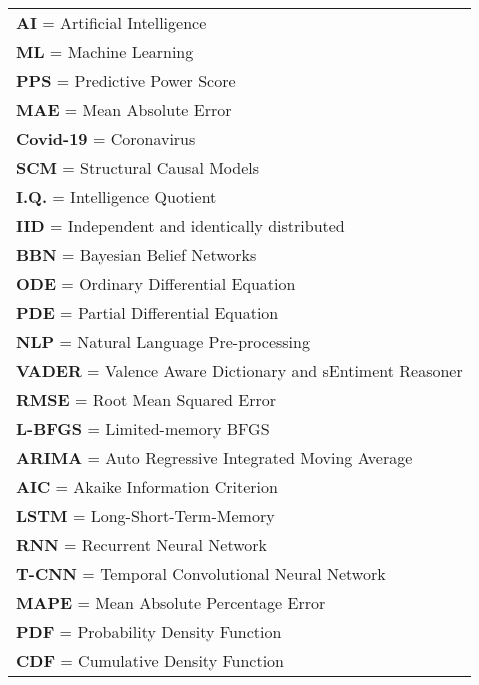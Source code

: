 \newpage
{}

\begin{Listofabbreviations}
\vspace*{10pt}

\begin{center}
    \begin{tabular}{@{}l@{}}
    \textbf{AI} = Artificial Intelligence \\
    \textbf{ML} = Machine Learning \\
    \textbf{PPS} = Predictive Power Score \\
    \textbf{MAE} = Mean Absolute Error \\
    \textbf{Covid-19} = Coronavirus \\
    \textbf{SCM} = Structural Causal Models \\
    \textbf{I.Q.} = Intelligence Quotient \\
    \textbf{IID} = Independent and identically distributed \\
    \textbf{BBN} = Bayesian Belief Networks \\
    \textbf{ODE} = Ordinary Differential Equation \\
    \textbf{PDE} = Partial Differential Equation \\
    \textbf{NLP} = Natural Language Pre-processing \\
    \textbf{VADER} = Valence Aware Dictionary and sEntiment Reasoner \\
    \textbf{RMSE} = Root Mean Squared Error \\ 
    \textbf{L-BFGS} = Limited-memory BFGS \\ 
    \textbf{ARIMA} = Auto Regressive Integrated Moving Average \\
    \textbf{AIC} = Akaike Information Criterion \\
    \textbf{LSTM} = Long-Short-Term-Memory \\
    \textbf{RNN} = Recurrent Neural Network \\
    \textbf{T-CNN} = Temporal Convolutional Neural Network \\
    \textbf{MAPE} = Mean Absolute Percentage Error \\
    \textbf{PDF} = Probability Density Function \\
    \textbf{CDF} = Cumulative Density Function \\
    \end{tabular}
\end{center}

\end{Listofabbreviations}